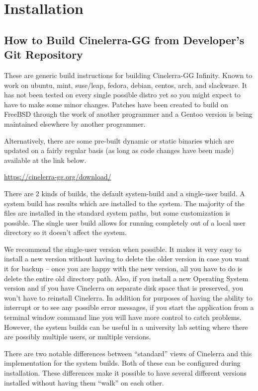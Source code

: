 \chapter{Installation}
\label{cha:Instalation}
\section{How to Build Cinelerra-GG from Developer's Git Repository}%
\label{sec:How_to_build}

These are generic build instructions for building Cinelerra-GG Infinity.  
Known to work on ubuntu, mint, suse/leap, fedora, debian, centos, arch, and slackware.  
It has not been tested on every single possible distro yet so you might expect to have to make some minor changes.  
Patches have been created to build on FreeBSD through the work of another programmer and a Gentoo version is being maintained elsewhere by another programmer.

Alternatively, there are some pre-built dynamic or static binaries which are updated on a fairly regular basis (as long as code changes have been made) available at the link below.


\url{
https://cinelerra-gg.org/download/
}

There are 2 kinds of builds, the default system-build and a single-user build.  
A system build has results which are installed to the system. 
The majority of the files are installed in the standard system paths, but some customization is possible. 
The single user build allows for running completely out of a local user directory so it doesn't affect the system.

We recommend the single-user version when possible.  
It makes it very easy to install a new version without having to delete the older version in case you want it for backup – once you are happy with the new version, all you have to do is delete the entire old directory path.  
Also, if you install a new Operating System version and if you have Cinelerra on separate disk space that is preserved, you won't have to reinstall Cinelerra.  
In addition for purposes of having the ability to interrupt or to see any possible error messages, if you start the application from a terminal window command line you will have more control to catch problems.  
However, the system builds can be useful in a university lab setting where there are possibly multiple users, or multiple versions.

There are two notable differences between “standard” views of Cinelerra and this implementation for the system builds.  
Both of these can be configured during installation.  
These differences make it possible to have several different versions installed without having them “walk” on each other. 










